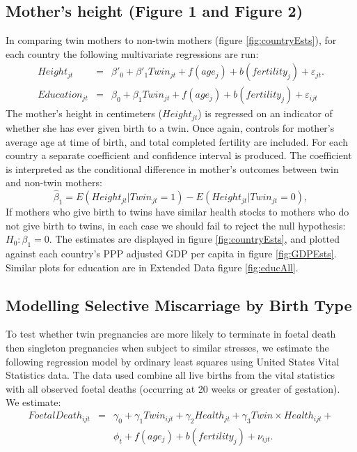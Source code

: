 \documentclass{nature}
\begin{document}
\begin{linenumbers}
\subsection{Mother's height (Figure 1 and Figure 2)}
In comparing twin mothers to non-twin mothers (figure \ref{fig:countryEsts}), for each country the following multivariate regressions are run:
\begin{eqnarray}
  Height_{jt}&=&\beta'_0 + \beta'_1 Twin_{jt} + f(age_j) + b(fertility_j) + \varepsilon_{jt}.\\
  Education_{jt}&=&\beta_0 + \beta_1 Twin_{jt} + f(age_j) + b(fertility_j) + \varepsilon_{ijt} 
\end{eqnarray}
The mother's height in centimeters ($Height_{jt}$) is regressed on an indicator of whether she has ever given birth to a twin.  Once again, controls for mother's average age at time of birth, and total completed fertility are included.  For each country a separate coefficient and confidence interval is produced.  The coefficient is interpreted as the conditional difference in mother's outcomes between twin and non-twin mothers:
\[
\hat\beta_1 = E(Height_{jt}| Twin_{jt}=1) - E(Height_{jt}| Twin_{jt}=0),
\]
 If mothers who give birth to twins have similar health stocks to mothers who do not give birth to twins, in each case we should fail to reject the null hypothesis: $H_0: \beta_1=0$.  The estimates are displayed in figure \ref{fig:countryEsts}, and plotted against each country's PPP adjusted GDP per capita in figure \ref{fig:GDPEsts}.  Similar plots for education are in Extended Data figure \ref{fig:educAll}.%

\subsection{Modelling Selective Miscarriage by Birth Type}
To test whether twin  pregnancies are more likely to terminate in foetal death then singleton pregnancies when subject to similar stresses, we estimate the following regression model by ordinary least squares using United States Vital Statistics data.  The data used combine all live births from the vital statistics with all observed foetal deaths (occurring at 20 weeks or greater of gestation).  We estimate:
\begin{eqnarray}
  FoetalDeath_{ijt} &=& \gamma_0 + \gamma_1 Twin_{ijt} + \gamma_2 Health_{jt} + \gamma_3 Twin\times Health_{ijt} + \nonumber \\ && \phi_t + f(age_j) + b(fertility_j) + \nu_{ijt}.
\end{eqnarray}


\end{linenumbers}
\end{document}
